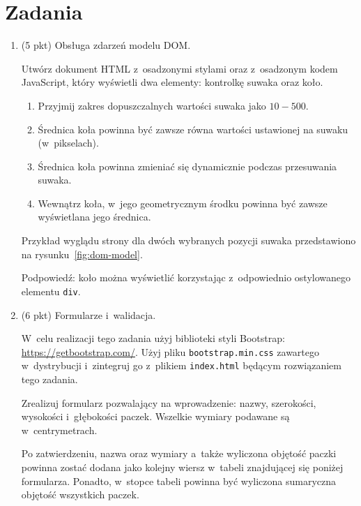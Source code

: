 \documentclass[12pt]{article}
\begin{document}
    \section*{Zadania}
        \begin{enumerate}
        \item\label{exc:dom-model}
            (5 pkt) Obsługa zdarzeń modelu DOM.

            Utwórz dokument HTML z~osadzonymi stylami oraz z~osadzonym kodem JavaScript, który wyświetli dwa elementy: kontrolkę suwaka oraz koło.

            \begin{enumerate}
                \item Przyjmij zakres dopuszczalnych wartości suwaka jako $10 - 500$.
                \item Średnica koła powinna być zawsze równa wartości ustawionej na suwaku (w~pikselach).
                \item Średnica koła powinna zmieniać się dynamicznie podczas przesuwania suwaka.
                \item Wewnątrz koła, w~jego geometrycznym środku powinna być zawsze wyświetlana jego średnica.
            \end{enumerate}


            Przykład wyglądu strony dla dwóch wybranych pozycji suwaka przedstawiono na rysunku~\ref{fig:dom-model}.

            Podpowiedź: koło można wyświetlić korzystając z~odpowiednio ostylowanego elementu \texttt{div}.

            \item\label{exc:forms}
            (6 pkt) Formularze i~walidacja.

            W~celu realizacji tego zadania użyj biblioteki styli Bootstrap: \url{https://getbootstrap.com/}.
            Użyj pliku \texttt{bootstrap.min.css} zawartego w~dystrybucji i~zintegruj go z~plikiem \texttt{index.html} będącym rozwiązaniem tego zadania.

            Zrealizuj formularz pozwalający na wprowadzenie: nazwy, szerokości, wysokości i~głębokości paczek.
            Wszelkie wymiary podawane są w~centrymetrach.

            Po zatwierdzeniu, nazwa oraz wymiary a~także wyliczona objętość paczki powinna zostać dodana jako kolejny wiersz w~tabeli znajdującej się poniżej formularza.
            Ponadto, w~stopce tabeli powinna być wyliczona sumaryczna objętość wszystkich paczek.


\end{enumerate}
\end{document}
